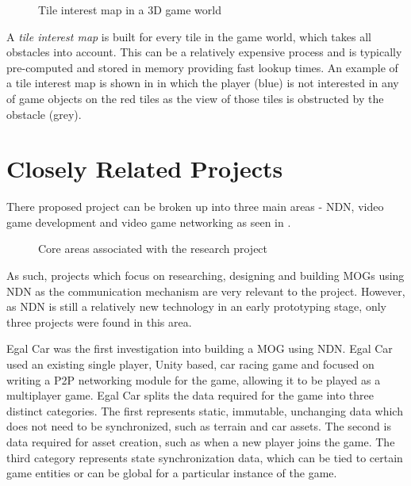 \begin{figure}[H]
    \centering
    \caption{Tile interest map in a 3D game world}
    \label{fig:tile-im}
\end{figure}

 A \textit{tile interest map} is built for every tile in the game world, which takes all obstacles into account. This can be a relatively expensive process and is typically pre-computed and stored in memory providing fast lookup times. An example of a tile interest map is shown in  in which the player (blue) is not interested in any of game objects on the red tiles as the view of those tiles is obstructed by the obstacle (grey).   



\section{Closely Related Projects}
There proposed project can be broken up into three main areas - NDN, video game development and video game networking as seen in . 

\begin{figure}[H]
    \centering
    \caption{Core areas associated with the research project}
    \label{fig:venn}
\end{figure}

As such, projects which focus on researching, designing and building MOGs using NDN as the communication mechanism are very relevant to the project. However, as NDN is still a relatively new technology in an early prototyping stage, only three projects were found in this area.

Egal Car was the first investigation into building a MOG using NDN. Egal Car used an existing single player, Unity based, car racing game and focused on writing a P2P networking module for the game, allowing it to be played as a multiplayer game. Egal Car splits the data required for the game into three distinct categories. The first represents static, immutable, unchanging data which does not need to be synchronized, such as terrain and car assets. The second is data required for asset creation, such as when a new player joins the game. The third category represents state synchronization data, which can be tied to certain game entities or can be global for a particular instance of the game.

